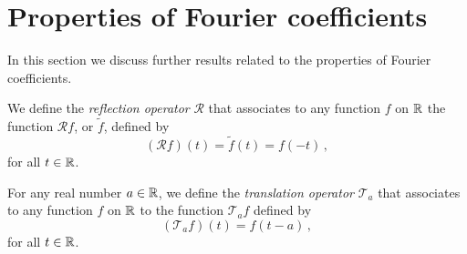 \section{Properties of Fourier coefficients}
In this section we discuss further results related to the properties of Fourier coefficients.
\begin{definition}
  We define the \emph{reflection operator} $\mathcal{R}$ that associates to any function $f$ on $\mathbb{R}$
  the function $\mathcal{R}f$, or $\tilde{f}$, defined by
  \begin{equation}
    (\mathcal{R}f)(t)=\tilde{f}(t)=f(-t)\,,
  \end{equation}
  for all $t\in\mathbb{R}$.
\end{definition}
\begin{definition}
  For any real number $a\in\mathbb{R}$, we define the \emph{translation operator}
  $\mathcal{T}_a$ that associates to any function $f$ on $\mathbb{R}$ to the function
  $\mathcal{T}_af$ defined by
  \begin{equation}
    (\mathcal{T}_af)(t)=f(t-a)\,,
  \end{equation}
  for all $t\in\mathbb{R}$.
\end{definition}

